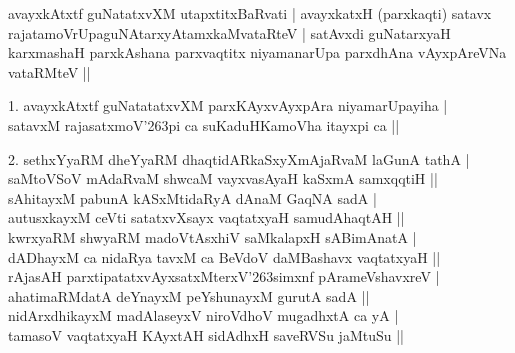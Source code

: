 \begin{entry}
\medskip

\begin{shl}
avayxkAtxtf guNatatxvXM utapxtitxBaRvati | avayxkatxH (parxkaqti) satavx\\
rajatamoVrUpaguNAtarxyAtamxkaMvataRteV | satAvxdi guNatarxyaH\\
karxmashaH parxkAshana parxvaqtitx niyamanarUpa parxdhAna vAyxpAreVNa vataRMteV ||
\end{shl}
\smallskip
\begin{shl}
1. avayxkAtxtf guNatatatxvXM parxKAyxvAyxpAra niyamarUpayiha |\\
satavxM rajasatxmoV\char'263pi ca suKaduHKamoVha itayxpi ca ||
\end{shl}
\smallskip
{}
\smallskip
\begin{shl}
2. sethxYyaRM dheYyaRM dhaqtidARkaSxyXmAjaRvaM laGunA tathA |\\
saMtoVSoV mAdaRvaM shwcaM vayxvasAyaH kaSxmA samxqqtiH ||\\
sAhitayxM pabunA kASxMtidaRyA dAnaM GaqNA sadA |\\
autusxkayxM ceVti satatxvXsayx vaqtatxyaH samudAhaqtAH ||\\
kwrxyaRM shwyaRM madoVtAsxhiV saMkalapxH sABimAnatA |\\
dADhayxM ca nidaRya tavxM ca BeVdoV daMBashavx vaqtatxyaH ||\\
rAjasAH parxtipatatxvAyxsatxMterxV\char'263simxnf pArameVshavxreV |\\
ahatimaRMdatA deYnayxM peYshunayxM gurutA sadA ||\\
nidArxdhikayxM madAlaseyxV niroVdhoV mugadhxtA ca yA |\\
tamasoV vaqtatxyaH KAyxtAH sidAdhxH saveRVSu jaMtuSu ||
\end{shl}
\smallskip
{}
\end{entry}

\begin{entry}
\end{entry}

